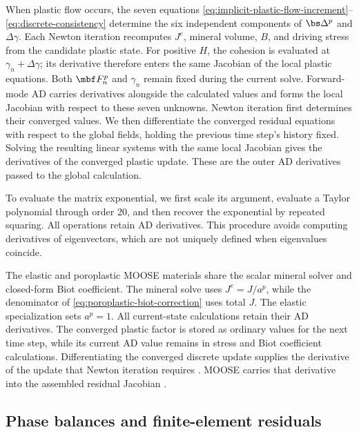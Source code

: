 When plastic flow occurs, the seven equations
\eqref{eq:implicit-plastic-flow-increment}--\eqref{eq:discrete-consistency}
determine the six independent components of \(\bs\Delta^p\) and
\(\Delta\gamma\).  Each Newton iteration recomputes \(J^e\), mineral
volume, \(B\), and driving stress from the candidate plastic state.
For positive \(H\), the cohesion is evaluated at
\(\gamma_n+\Delta\gamma\); its derivative therefore enters the same
Jacobian of the local plastic equations.  Both \(\mbf F^p_n\) and \(\gamma_n\) remain
fixed during the current solve.
Forward-mode AD carries derivatives alongside the calculated values and
forms the local Jacobian with respect to these seven unknowns.  Newton
iteration first determines their converged values.  We then differentiate
the converged residual equations with respect to the global fields, holding
the previous time step's history fixed.  Solving the resulting linear systems
with the same local Jacobian gives the derivatives of the converged plastic
update.  These are the outer AD derivatives passed to the global calculation.

To evaluate the matrix exponential, we first scale its argument, evaluate a
Taylor polynomial through order 20, and then recover the exponential by
repeated squaring.  All operations retain AD derivatives.  This procedure
avoids computing derivatives of eigenvectors, which are not uniquely defined
when eigenvalues coincide.

The elastic and poroplastic MOOSE materials share the scalar mineral solver
and closed-form Biot coefficient.  The mineral solve uses \(J^e=J/a^p\), while
the denominator of \eqref{eq:poroplastic-biot-correction} uses total \(J\).
The elastic specialization sets \(a^p=1\).
All current-state calculations retain their
AD derivatives.  The converged plastic factor is stored as ordinary values
for the next time step, while its current AD value remains in stress and
Biot coefficient calculations.  Differentiating the converged discrete update
supplies the derivative of the update that Newton iteration requires
\citep{simotaylor1985,miehe1996}.  MOOSE carries that derivative into the
assembled residual Jacobian \citep{lindsayetal2021ad}.

\subsection{Phase balances and finite-element residuals}
\label{sec:fluid-storage-and-transport}
\label{sec:weak-residuals-and-spaces}


